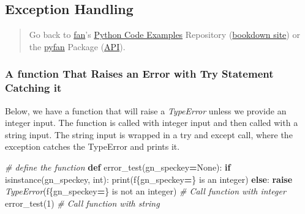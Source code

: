 \documentclass[
]{book}
\newenvironment{Shaded}{\begin{snugshade}}{\end{snugshade}}
\newcommand{\BuiltInTok}[1]{#1}
\newcommand{\CommentTok}[1]{\textcolor[rgb]{0.56,0.35,0.01}{\textit{#1}}}
\newcommand{\ControlFlowTok}[1]{\textcolor[rgb]{0.13,0.29,0.53}{\textbf{#1}}}
\newcommand{\DecValTok}[1]{\textcolor[rgb]{0.00,0.00,0.81}{#1}}
\newcommand{\KeywordTok}[1]{\textcolor[rgb]{0.13,0.29,0.53}{\textbf{#1}}}
\newcommand{\NormalTok}[1]{#1}
\newcommand{\OperatorTok}[1]{\textcolor[rgb]{0.81,0.36,0.00}{\textbf{#1}}}
\newcommand{\PreprocessorTok}[1]{\textcolor[rgb]{0.56,0.35,0.01}{\textit{#1}}}
\newcommand{\SpecialCharTok}[1]{\textcolor[rgb]{0.00,0.00,0.00}{#1}}
\newcommand{\SpecialStringTok}[1]{\textcolor[rgb]{0.31,0.60,0.02}{#1}}
\newcommand{\VariableTok}[1]{\textcolor[rgb]{0.00,0.00,0.00}{#1}}
\begin{document}
\hypertarget{exception-handling}{%
\subsection{Exception Handling}\label{exception-handling}}

\begin{quote}
Go back to \href{http://fanwangecon.github.io/}{fan}'s \href{https://fanwangecon.github.io/Py4Econ/}{Python Code Examples} Repository (\href{https://fanwangecon.github.io/Py4Econ/bookdown}{bookdown site}) or the \href{https://pyfan.readthedocs.io/en/latest/}{pyfan} Package (\href{https://pyfan.readthedocs.io/en/latest/reference.html}{API}).
\end{quote}

\hypertarget{a-function-that-raises-an-error-with-try-statement-catching-it}{%
\subsubsection{A function That Raises an Error with Try Statement Catching it}\label{a-function-that-raises-an-error-with-try-statement-catching-it}}

Below, we have a function that will raise a \emph{TypeError} unless we provide an integer input. The function is called with integer input and then called with a string input. The string input is wrapped in a try and except call, where the exception catches the TypeError and prints it.

\begin{Shaded}
\begin{Highlighting}[]
\CommentTok{\# define the function}
\KeywordTok{def}\NormalTok{ error\_test(gn\_speckey}\OperatorTok{=}\VariableTok{None}\NormalTok{):}
    \ControlFlowTok{if} \BuiltInTok{isinstance}\NormalTok{(gn\_speckey, }\BuiltInTok{int}\NormalTok{):}
        \BuiltInTok{print}\NormalTok{(}\SpecialStringTok{f\textquotesingle{}}\SpecialCharTok{\{}\NormalTok{gn\_speckey}\OperatorTok{=}\SpecialCharTok{\}}\SpecialStringTok{ is an integer\textquotesingle{}}\NormalTok{)}
    \ControlFlowTok{else}\NormalTok{:}
        \ControlFlowTok{raise} \PreprocessorTok{TypeError}\NormalTok{(}\SpecialStringTok{f\textquotesingle{}}\SpecialCharTok{\{}\NormalTok{gn\_speckey}\OperatorTok{=}\SpecialCharTok{\}}\SpecialStringTok{ is not an integer\textquotesingle{}}\NormalTok{)}
\CommentTok{\# Call function with integer}
\NormalTok{error\_test(}\DecValTok{1}\NormalTok{)}
\CommentTok{\# Call function with string}
\end{Highlighting}
\end{Shaded}
\end{document}
